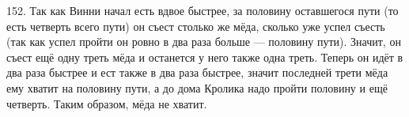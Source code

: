 152. Так как Винни начал есть вдвое быстрее, за половину оставшегося пути (то есть четверть всего пути) он съест столько же мёда, сколько уже успел съесть (так как успел пройти он ровно в два раза больше --- половину пути). Значит, он съест ещё одну треть мёда и останется у него также одна треть. Теперь он идёт в два раза быстрее и ест также в два раза быстрее, значит последней трети мёда ему хватит на половину пути, а до дома Кролика надо пройти половину и ещё четверть. Таким образом, мёда не хватит.\\
